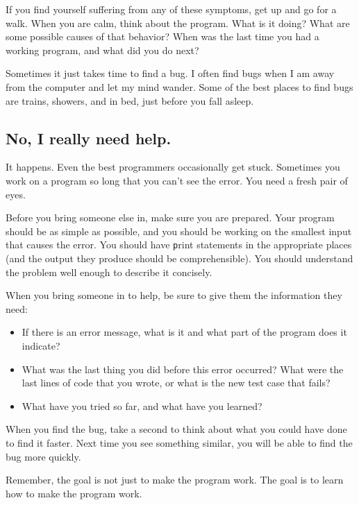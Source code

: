 \documentclass[
DIV=11,
fontsize=13,
twoside,
headinclude=false,
titlepage=firstiscover,
abstract=true,
headsepline=true,
footsepline=true,
chapterprefix=true, %
headings=big,
bibliography=totoc,%
captions=tableheading
]{scrbook}
\theoremstyle{definition}
\begin{document}
If you find yourself suffering from any of these symptoms, get
up and go for a walk.  When you are calm, think about the program.
What is it doing?  What are some possible causes of that
behavior?  When was the last time you had a working program,
and what did you do next?

Sometimes it just takes time to find a bug.  I often find bugs
when I am away from the computer and let my mind wander.  Some
of the best places to find bugs are trains, showers, and in bed,
just before you fall asleep.


\subsection{No, I really need help.}

It happens.  Even the best programmers occasionally get stuck.
Sometimes you work on a program so long that you can't see the
error.  You need a fresh pair of eyes.

Before you bring someone else in, make sure you are prepared.
Your program should be as simple
as possible, and you should be working on the smallest input
that causes the error.  You should have {\texttt print} statements in the
appropriate places (and the output they produce should be
comprehensible).  You should understand the problem well enough
to describe it concisely.

When you bring someone in to help, be sure to give
them the information they need:

\begin{itemize}

\item If there is an error message, what is it
and what part of the program does it indicate?

\item What was the last thing you did before this error occurred?
What were the last lines of code that you wrote, or what is
the new test case that fails?

\item What have you tried so far, and what have you learned?

\end{itemize}

When you find the bug, take a second to think about what you
could have done to find it faster.  Next time you see something
similar, you will be able to find the bug more quickly.

Remember, the goal is not just to make the program
work.  The goal is to learn how to make the program work.
\end{document}
